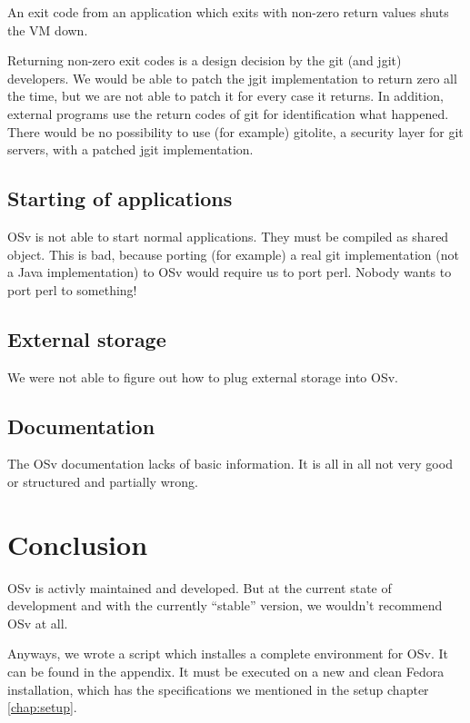         An exit code from an application which exits with non-zero return values
        shuts the VM down.

        Returning non-zero exit codes is a design decision by the git (and jgit)
        developers. We would be
        able to patch the jgit implementation to return zero all the time, but
        we are not able to patch it for every case it returns. In addition,
        external programs use the return codes of git for identification what
        happened. There would be no possibility to use (for example) gitolite, a
        security layer for git servers, with a patched jgit implementation.

    \section{Starting of applications}

        OSv is not able to start normal applications. They must be compiled as
        shared object. This is bad, because porting (for example) a real git
        implementation (not a Java implementation) to OSv would require us to
        port perl. Nobody wants to port perl to something!

    \section{External storage}

        We were not able to figure out how to plug external storage into OSv.

    \section{Documentation}

        The OSv documentation lacks of basic information. It is all in all not
        very good or structured and partially wrong.

\chapter{Conclusion}

    OSv is activly maintained and developed. But at the current state of
    development and with the currently ``stable'' version, we wouldn't recommend
    OSv at all.

    Anyways, we wrote a script which installes a complete environment for OSv.
    It can be found in the appendix. It must be executed on a new and clean
    Fedora installation, which has the specifications we mentioned in the setup
    chapter \ref{chap:setup}.
